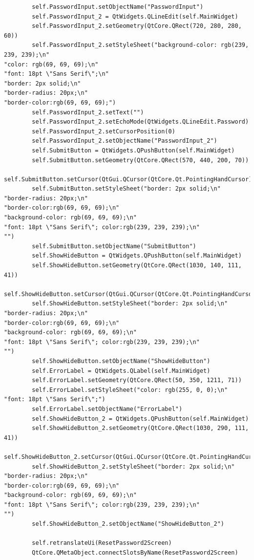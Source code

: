 \documentclass[12pt]{article}
\begin{document}
\begin{lstlisting}
        self.PasswordInput.setObjectName("PasswordInput")
        self.PasswordInput_2 = QtWidgets.QLineEdit(self.MainWidget)
        self.PasswordInput_2.setGeometry(QtCore.QRect(720, 280, 280, 60))
        self.PasswordInput_2.setStyleSheet("background-color: rgb(239, 239, 239);\n"
"color: rgb(69, 69, 69);\n"
"font: 18pt \"Sans Serif\";\n"
"border: 2px solid;\n"
"border-radius: 20px;\n"
"border-color:rgb(69, 69, 69);")
        self.PasswordInput_2.setText("")
        self.PasswordInput_2.setEchoMode(QtWidgets.QLineEdit.Password)
        self.PasswordInput_2.setCursorPosition(0)
        self.PasswordInput_2.setObjectName("PasswordInput_2")
        self.SubmitButton = QtWidgets.QPushButton(self.MainWidget)
        self.SubmitButton.setGeometry(QtCore.QRect(570, 440, 200, 70))
        self.SubmitButton.setCursor(QtGui.QCursor(QtCore.Qt.PointingHandCursor))
        self.SubmitButton.setStyleSheet("border: 2px solid;\n"
"border-radius: 20px;\n"
"border-color:rgb(69, 69, 69);\n"
"background-color: rgb(69, 69, 69);\n"
"font: 18pt \"Sans Serif\"; color:rgb(239, 239, 239);\n"
"")
        self.SubmitButton.setObjectName("SubmitButton")
        self.ShowHideButton = QtWidgets.QPushButton(self.MainWidget)
        self.ShowHideButton.setGeometry(QtCore.QRect(1030, 140, 111, 41))
        self.ShowHideButton.setCursor(QtGui.QCursor(QtCore.Qt.PointingHandCursor))
        self.ShowHideButton.setStyleSheet("border: 2px solid;\n"
"border-radius: 20px;\n"
"border-color:rgb(69, 69, 69);\n"
"background-color: rgb(69, 69, 69);\n"
"font: 18pt \"Sans Serif\"; color:rgb(239, 239, 239);\n"
"")
        self.ShowHideButton.setObjectName("ShowHideButton")
        self.ErrorLabel = QtWidgets.QLabel(self.MainWidget)
        self.ErrorLabel.setGeometry(QtCore.QRect(50, 350, 1211, 71))
        self.ErrorLabel.setStyleSheet("color: rgb(255, 0, 0);\n"
"font: 18pt \"Sans Serif\";")
        self.ErrorLabel.setObjectName("ErrorLabel")
        self.ShowHideButton_2 = QtWidgets.QPushButton(self.MainWidget)
        self.ShowHideButton_2.setGeometry(QtCore.QRect(1030, 290, 111, 41))
        self.ShowHideButton_2.setCursor(QtGui.QCursor(QtCore.Qt.PointingHandCursor))
        self.ShowHideButton_2.setStyleSheet("border: 2px solid;\n"
"border-radius: 20px;\n"
"border-color:rgb(69, 69, 69);\n"
"background-color: rgb(69, 69, 69);\n"
"font: 18pt \"Sans Serif\"; color:rgb(239, 239, 239);\n"
"")
        self.ShowHideButton_2.setObjectName("ShowHideButton_2")

        self.retranslateUi(ResetPassword2Screen)
        QtCore.QMetaObject.connectSlotsByName(ResetPassword2Screen)


\end{lstlisting}
\end{document}
